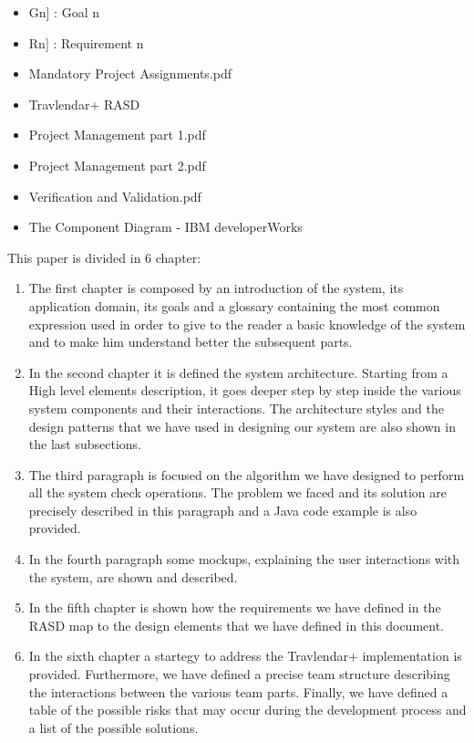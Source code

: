 \begin{itemize}
	\setlength{\leftskip}{0.5cm}
	\item \lbrack Gn] : Goal n
	\item \lbrack Rn] : Requirement n
\end{itemize}

\begin{itemize}
	\setlength{\leftskip}{0.5cm}
	\item Mandatory Project Assignments.pdf
	\item Travlendar+ RASD
	\item Project Management part 1.pdf
	\item Project Management part 2.pdf
	\item Verification and Validation.pdf
	\item The Component Diagram - IBM developerWorks
\end{itemize}

This paper is divided in 6 chapter:
\begin{enumerate}
	\setlength{\leftskip}{0.5cm}
	\item The first chapter is composed by an introduction of the system, its application domain, its goals and a glossary containing the most common expression used in order to give to the reader a basic knowledge of the system and to make him understand better the subsequent parts.
	
	\item In the second chapter it is defined the system architecture. Starting from a High level elements description, it goes deeper step by step inside the various system components and their interactions. The architecture styles and the design patterns that we have used in designing our system are also shown in the last subsections.
	
	\item The third paragraph is focused on the algorithm we have designed to perform all the system check operations. The problem we faced and its solution are precisely described in this paragraph and a Java code example is also provided.
	
	\item In the fourth paragraph some mockups, explaining the user interactions with the system, are shown and described.
	
	\item In the fifth chapter is shown how the requirements we have defined in the RASD map to the design elements that we have defined in this document.
	
	\item In the sixth chapter a startegy to address the Travlendar+ implementation is provided. Furthermore, we have defined a precise team structure describing the interactions between the various team parts. Finally, we have defined a table of the possible risks that may occur during the development process and a list of the possible solutions.
\end{enumerate}